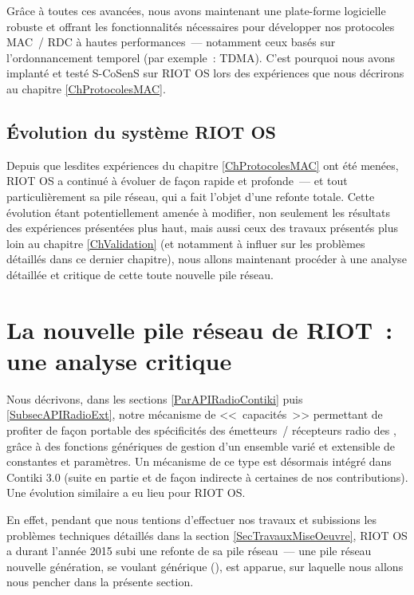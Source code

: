 \bigskip

Grâce à toutes ces avancées, nous avons maintenant une plate-forme
logicielle robuste et offrant les fonctionnalités nécessaires pour
développer nos protocoles MAC~/ RDC à hautes performances~--- notamment
ceux basés sur l'ordonnancement temporel (par exemple~: TDMA).
C'est pourquoi nous avons implanté et testé S-CoSenS sur RIOT OS lors des
expériences que nous décrirons au chapitre \vref{ChProtocolesMAC}.


\subsection{\'Evolution du système RIOT OS}
\label{SubSecEvoRIOT}

Depuis que lesdites expériences du chapitre \ref{ChProtocolesMAC} ont
été menées, RIOT OS a continué à évoluer de façon rapide et profonde~---
et tout particulièrement sa pile réseau, qui a fait l'objet d'une refonte
totale. Cette évolution étant potentiellement amenée à modifier, non
seulement les résultats des expériences présentées plus haut, mais aussi
ceux des travaux présentés plus loin au chapitre \vref{ChValidation}
(et notamment à influer sur les problèmes détaillés dans ce dernier
chapitre), nous allons maintenant procéder à une analyse détaillée
et critique de cette toute nouvelle pile réseau.


\section{La nouvelle pile réseau de RIOT~: une analyse critique}
\label{SecGnrcRIOT}

Nous décrivons, dans les sections \vref{ParAPIRadioContiki} puis
\vref{SubsecAPIRadioExt}, notre mécanisme de <<~capacités~>> permettant
de profiter de façon portable des spécificités des émetteurs~/ récepteurs
radio des , grâce à des fonctions génériques de gestion
d'un ensemble varié et extensible de constantes et paramètres.
Un mécanisme de ce type est désormais intégré dans Contiki 3.0
\cite{Contiki3Annonce} (suite en partie et de façon indirecte à certaines
de nos contributions). Une évolution similaire a eu lieu pour RIOT OS.

En effet, pendant que nous tentions d'effectuer nos travaux
et subissions les problèmes techniques détaillés dans la section
\vref{SecTravauxMiseOeuvre}, RIOT OS a durant l'année 2015 subi une
refonte de sa pile réseau~--- une pile réseau nouvelle génération,
se voulant générique (), est apparue, sur laquelle
nous allons nous pencher dans la présente section.

